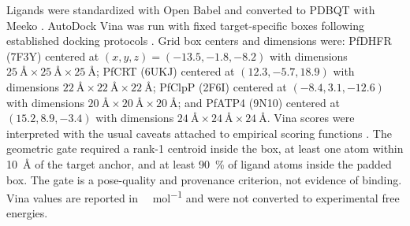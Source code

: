 \documentclass[journal=jcisd8,manuscript=article]{achemso}
\begin{document}
Ligands were standardized with Open Babel \cite{OBoyle2011} and converted to PDBQT with Meeko \cite{Eberhardt2021}. AutoDock Vina was run with fixed target-specific boxes following established docking protocols \cite{Trott2009}. Grid box centers and dimensions were: PfDHFR (7F3Y) centered at $(x,y,z) = (\num{-13.5}, \num{-1.8}, \num{-8.2})$ with dimensions $\SI{25}{\angstrom} \times \SI{25}{\angstrom} \times \SI{25}{\angstrom}$; PfCRT (6UKJ) centered at $(\num{12.3}, \num{-5.7}, \num{18.9})$ with dimensions $\SI{22}{\angstrom} \times \SI{22}{\angstrom} \times \SI{22}{\angstrom}$; PfClpP (2F6I) centered at $(\num{-8.4}, \num{3.1}, \num{-12.6})$ with dimensions $\SI{20}{\angstrom} \times \SI{20}{\angstrom} \times \SI{20}{\angstrom}$; and PfATP4 (9N10) centered at $(\num{15.2}, \num{8.9}, \num{-3.4})$ with dimensions $\SI{24}{\angstrom} \times \SI{24}{\angstrom} \times \SI{24}{\angstrom}$. Vina scores were interpreted with the usual caveats attached to empirical scoring functions \cite{Quiroga2016}. The geometric gate required a rank-1 centroid inside the box, at least one atom within \qty{10}{\angstrom} of the target anchor, and at least \qty{90}{\percent} of ligand atoms inside the padded box. The gate is a pose-quality and provenance criterion, not evidence of binding. Vina values are reported in \si{\kilo\calorie\per\mole} and were not converted to experimental free energies.
\end{document}
